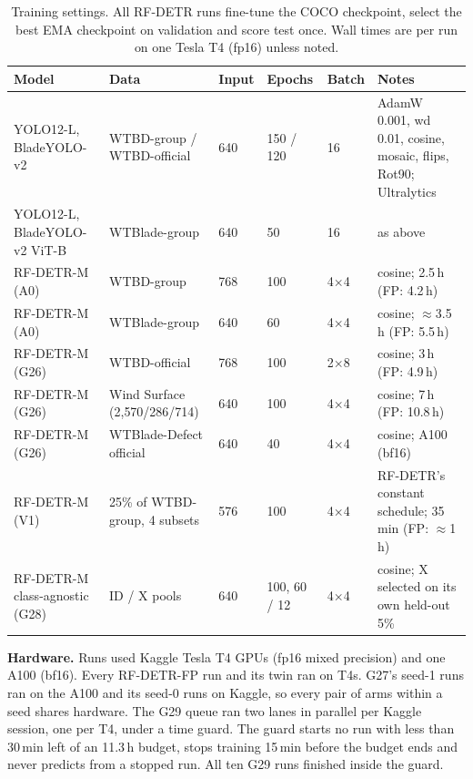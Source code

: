 \begin{table}[!t]
\centering
\caption{Training settings. All RF-DETR runs fine-tune the COCO checkpoint, select the best EMA checkpoint on validation and score test once. Wall times are per run on one Tesla T4 (fp16) unless noted.}
\label{tab:recipes}
\footnotesize
\begin{tabularx}{\textwidth}{@{}l l l l l X@{}}
\toprule
Model & Data & Input & Epochs & Batch & Notes \\
\midrule
YOLO12-L, BladeYOLO-v2 & WTBD-group / WTBD-official & 640 & 150 / 120 & 16 & AdamW 0.001, wd 0.01, cosine, mosaic, flips, Rot90; Ultralytics \\
YOLO12-L, BladeYOLO-v2 ViT-B & WTBlade-group & 640 & 50 & 16 & as above \\
RF-DETR-M (A0) & WTBD-group & 768 & 100 & 4$\times$4 & cosine; 2.5\,h (FP: 4.2\,h) \\
RF-DETR-M (A0) & WTBlade-group & 640 & 60 & 4$\times$4 & cosine; $\approx$3.5\,h (FP: 5.5\,h) \\
RF-DETR-M (G26) & WTBD-official & 768 & 100 & 2$\times$8 & cosine; 3\,h (FP: 4.9\,h) \\
RF-DETR-M (G26) & Wind Surface (2{,}570/286/714) & 640 & 100 & 4$\times$4 & cosine; 7\,h (FP: 10.8\,h) \\
RF-DETR-M (G26) & WTBlade-Defect official & 640 & 40 & 4$\times$4 & cosine; A100 (bf16) \\
RF-DETR-M (V1) & 25\% of WTBD-group, 4 subsets & 576 & 100 & 4$\times$4 & RF-DETR's constant schedule; 35\,min (FP: $\approx$1\,h) \\
RF-DETR-M class-agnostic (G28) & ID / X pools & 640 & 100, 60 / 12 & 4$\times$4 & cosine; X selected on its own held-out 5\% \\
\bottomrule
\end{tabularx}
\end{table}

\textbf{Hardware.} Runs used Kaggle Tesla T4 GPUs (fp16 mixed precision) and one A100 (bf16). Every RF-DETR-FP run and its twin ran on T4s. G27's seed-1 runs ran on the A100 and its seed-0 runs on Kaggle, so every pair of arms within a seed shares hardware. The G29 queue ran two lanes in parallel per Kaggle session, one per T4, under a time guard. The guard starts no run with less than 30\,min left of an 11.3\,h budget, stops training 15\,min before the budget ends and never predicts from a stopped run. All ten G29 runs finished inside the guard.
